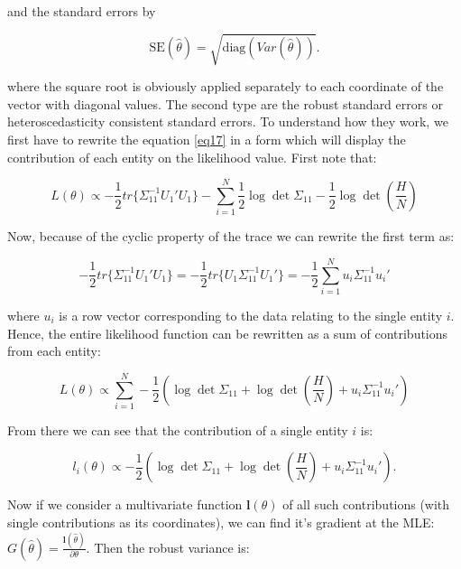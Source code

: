 \documentclass[a4paper]{article}
\begin{document}
\noindent and the standard errors by

\begin{equation}
\text{SE}(\hat{\theta}) = \sqrt{\text{diag}(Var(\hat{\theta}))}.
\end{equation}

\noindent where the square root is obviously applied separately to each coordinate of the vector with diagonal values.
The second type are the robust standard errors or heteroscedasticity consistent standard errors.
To understand how they work, we first have to rewrite the equation \autoref{eq17} in a form
which will display the contribution of each entity on the likelihood value.
First note that:

\begin{equation}
    L(\theta) \propto - \frac{1}{2} tr \{ \Sigma_{11}^{-1} U_1' U_1 \} - \sum_{i=1}^{N} \frac{1}{2} \log \det \Sigma_{11} - \frac{1}{2} \log \det (\frac{H}{N})
\end{equation}

\noindent Now, because of the cyclic property of the trace we can rewrite the first term as:

\begin{equation}
    - \frac{1}{2} tr \{ \Sigma_{11}^{-1} U_1' U_1 \} =
    - \frac{1}{2} tr \{ U_1 \Sigma_{11}^{-1} U_1' \} =
    - \frac{1}{2} \sum_{i=1}^N u_i \Sigma_{11}^{-1} u_i'
\end{equation}

\noindent where $u_i$ is a row vector corresponding to the data relating to the single entity $i$.
Hence, the entire likelihood function can be rewritten as a sum of contributions from each entity:

\begin{equation}
    L(\theta) \propto \sum_{i=1}^{N} -\frac{1}{2} (\log \det \Sigma_{11} + \log \det (\frac{H}{N}) + u_i \Sigma_{11}^{-1} u_i')
\end{equation}

\noindent From there we can see that the contribution of a single entity $i$ is:

\begin{equation}
 l_i(\theta) \propto -\frac{1}{2} (\log \det \Sigma_{11} + \log \det (\frac{H}{N}) + u_i \Sigma_{11}^{-1} u_i').
\end{equation}

\noindent Now if we consider a multivariate function $\mathbf{l}(\theta)$ of all such contributions
(with single contributions as its coordinates),
we can find it's gradient at the MLE: $G(\hat{\theta}) = \frac{\mathbf{l}(\hat{\theta})}{\partial \theta}$.
Then the robust variance is:
\end{document}
